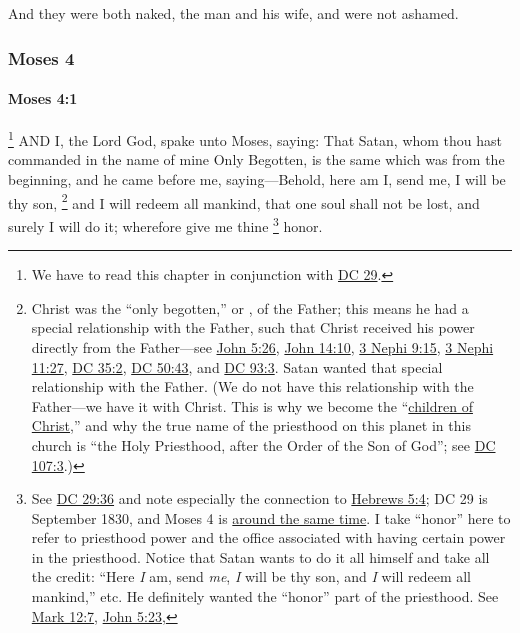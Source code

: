 			And they were both naked, the man and his wife, and were not ashamed.

		
	\subsubsection{Moses 4} %
		\label{MOSES-4}
		
		\paragraph{Moses 4:1} %
			\label{MOSES-4-1}

				\footnote{%
					We have to read this chapter in conjunction with \hyperref[DC29]{DC 29}.
					}%
			AND I, the Lord God, spake unto Moses, saying: That Satan, whom thou hast commanded in the name of mine Only Begotten, is the same which was from the beginning, and he came before me, saying---Behold, here am I, send me, I will be thy son,%
				\footnote{%
					Christ was the ``only begotten,'' or , of the Father; this means he had a special relationship with the Father, such that Christ received his power directly from the Father---see \hyperref[JOHN-5-26]{John 5:26}, \hyperref[JOHN-14-10]{John 14:10}, \hyperref[3NEPHI-9-15]{3 Nephi 9:15}, \hyperref[3NEPHI-11-27]{3 Nephi 11:27}, \hyperref[DC35-2]{DC 35:2}, \hyperref[DC50-43]{DC 50:43}, and \hyperref[DC93-3]{DC 93:3}. Satan wanted that special relationship with the Father. (We do not have this relationship with the Father---we have it with Christ. This is why we become the ``\hyperref[NEWBIRTH-children-christ]{children of Christ},'' and why the true name of the priesthood on this planet in this church is ``the Holy Priesthood, after the Order of the Son of God''; see \hyperref[DC107-3]{DC 107:3}.)
					}
			and I will redeem all mankind, that one soul shall not be lost, and surely I will do it; wherefore give me thine
				\footnote{%
					See \hyperref[DC29-36]{DC 29:36} and note especially the connection to \hyperref[HEBREWS-5-4]{Hebrews 5:4}; DC 29 is September 1830, and Moses 4 is \hyperref[JST-TIMELINE]{around the same time}. I take ``honor'' here to refer to priesthood power and the office associated with having certain power in the priesthood. Notice that Satan wants to do it all himself and take all the credit: ``Here \textit{I} am, send \textit{me}, \textit{I} will be thy son, and \textit{I} will redeem all mankind,'' etc. He definitely wanted the ``honor'' part of the priesthood. See \hyperref[MARK-12-7]{Mark 12:7}, \hyperref[JOHN-5-23]{John 5:23}, 
					}%
			honor.

